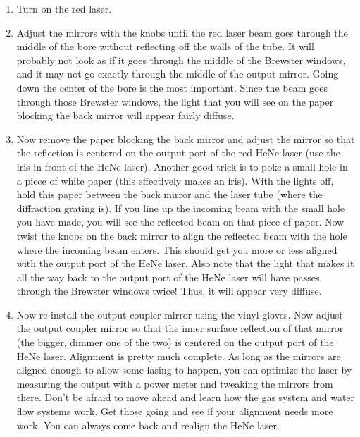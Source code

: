 \documentclass{../lab}
\begin{document}
\begin{enumerate}
    \item Turn on the red laser.
    
\newpage

    \item Adjust the mirrors with the knobs until the red laser beam goes through the middle of the bore without reflecting off the walls of the tube. It will probably not look as if it goes through the middle of the Brewster windows, and it may not go exactly through the middle of the output mirror. Going down the center of the bore is the most important. Since the beam goes through those Brewster windows, the light that you will see on the paper blocking the back mirror will appear fairly diffuse.

    \item Now remove the paper blocking the back mirror and adjust the mirror so that the reflection is centered on the output port of the red HeNe laser (use the iris in front of the HeNe laser). Another good trick is to poke a small hole in a piece of white paper (this effectively makes an iris). With the lights off, hold this paper between the back mirror and the laser tube (where the diffraction grating is). If you line up the incoming beam with the small hole you have made, you will see the reflected beam on that piece of paper. Now twist the knobs on the back mirror to align the reflected beam with the hole where the incoming beam enters. This should get you more or less aligned with the output port of the HeNe laser. Also note that the light that makes it all the way back to the output port of the HeNe laser will have passes through the Brewster windows twice! Thus, it will appear very diffuse.
    
    

    \item Now re-install the output coupler mirror using the vinyl gloves. Now adjust the output coupler mirror so that the inner surface reflection of that mirror (the bigger, dimmer one of the two) is centered on the output port of the HeNe laser. Alignment is pretty much complete. As long as the mirrors are aligned enough to allow some lasing to happen, you can optimize the laser by measuring the output with a power meter and tweaking the mirrors from there. Don't be afraid to move ahead and learn how the gas system and water flow systems work. Get those going and see if your alignment needs more work. You can always come back and realign the HeNe laser.


\end{enumerate}
\end{document}

